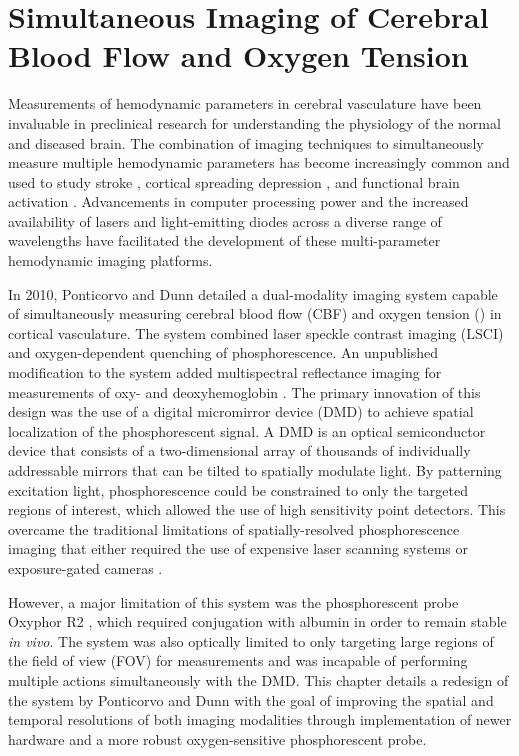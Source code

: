 
\chapter{Simultaneous Imaging of Cerebral Blood Flow and Oxygen Tension}

Measurements of hemodynamic parameters in cerebral vasculature have been invaluable in preclinical research for understanding the physiology of the normal and diseased brain. The combination of imaging techniques to simultaneously measure multiple hemodynamic parameters has become increasingly common and used to study stroke \cite{Jones:2008gb}, cortical spreading depression \cite{Sakadzic:2009jo}, and functional brain activation \cite{Dunn:2005gw, Dunn:2003wy}. Advancements in computer processing power and the increased availability of lasers and light-emitting diodes across a diverse range of wavelengths have facilitated the development of these multi-parameter hemodynamic imaging platforms.

In 2010, Ponticorvo and Dunn \cite{Ponticorvo:2010uv} detailed a dual-modality imaging system capable of simultaneously measuring cerebral blood flow (CBF) and oxygen tension () in cortical vasculature. The system combined laser speckle contrast imaging (LSCI) and oxygen-dependent quenching of phosphorescence. An unpublished modification to the system added multispectral reflectance imaging for measurements of oxy- and deoxyhemoglobin \cite{Ponticorvo:2010ur}. The primary innovation of this design was the use of a digital micromirror device (DMD) to achieve spatial localization of the phosphorescent signal. A DMD is an optical semiconductor device that consists of a two-dimensional array of thousands of individually addressable mirrors that can be tilted to spatially modulate light. By patterning excitation light, phosphorescence could be constrained to only the targeted regions of interest, which allowed the use of high sensitivity point detectors. This overcame the traditional limitations of spatially-resolved phosphorescence imaging that either required the use of expensive laser scanning systems \cite{Yaseen:2009ep, Kazmi:2013ey} or exposure-gated cameras \cite{Shonat:2003ia, Sakadzic:2009jo}.

However, a major limitation of this system was the phosphorescent probe Oxyphor R2 \cite{Dunphy:2002tz}, which required conjugation with albumin in order to remain stable \textit{in vivo}. The system was also optically limited to only targeting large regions of the field of view (FOV) for  measurements and was incapable of performing multiple actions simultaneously with the DMD. This chapter details a redesign of the system by Ponticorvo and Dunn \cite{Ponticorvo:2010uv} with the goal of improving the spatial and temporal resolutions of both imaging modalities through implementation of newer hardware and a more robust oxygen-sensitive phosphorescent probe.



